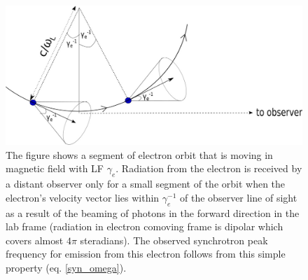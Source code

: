 \documentclass[12pt,a4paper]{article}
\begin{document}
\begin{figure}
\begin{center}
\includegraphics[width=12cm]{synchrotron-radiation.jpg}
\caption{The figure shows a segment of electron orbit that is moving in magnetic field with LF $\gamma_e$. Radiation from the electron is received by a distant observer only for a small segment of the orbit when the electron's velocity vector lies within $\gamma_e^{-1}$ of the observer line of sight as a result of the beaming of photons in the forward direction in the lab frame (radiation in electron comoving frame is dipolar which covers almost $4\pi$ steradians). The observed synchrotron peak frequency for emission from this electron follows from this simple property (eq. \ref{syn_omega}).
}\label{FIG:relativistic_beaming}
\end{center}
\end{figure}
\end{document}
